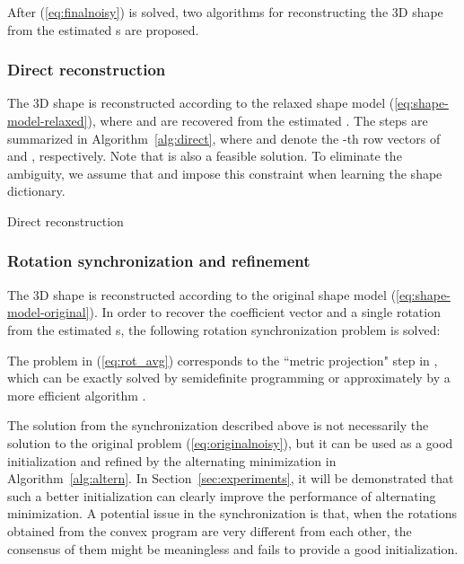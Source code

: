 \documentclass[10pt,journal,cspaper,compsoc]{IEEEtran}
\newcommand{\refEq}[1]{(\ref{#1})}
\newcommand{\refSec}[1]{Section~\ref{#1}}
\newcommand{\refAlg}[1]{Algorithm~\ref{#1}}
\begin{document}
After \refEq{eq:finalnoisy} is solved, two algorithms for reconstructing the 3D shape from the estimated s are proposed.

\subsubsection{Direct reconstruction}\label{sec:direct}

The 3D shape is reconstructed according to the relaxed shape model \refEq{eq:shape-model-relaxed}, where  and  are recovered from the estimated . The steps are summarized in \refAlg{alg:direct}, where  and  denote the -th row vectors of  and , respectively. Note that  is also a feasible solution. To eliminate the ambiguity, we assume that  and impose this constraint when learning the shape dictionary.

\begin{algorithm}\label{alg:direct}
\LinesNumbered
\caption{Direct reconstruction}
\KwIn{}
\KwOut{}
\vspace{0.5em}
\For{ \KwTo }{
\;
\;
\;
\;
\;
}
\;
\vspace{0.5em}
\end{algorithm}
\vspace{-1em}


\subsubsection{Rotation synchronization and refinement}\label{sec:refine}

The 3D shape is reconstructed according to the original shape model \refEq{eq:shape-model-original}. In order to recover the coefficient vector  and a single rotation  from the estimated s, the following rotation synchronization problem is solved:

The problem in \refEq{eq:rot_avg} corresponds to the ``metric projection" step in \cite{paladini2012optimal,del2012bilinear}, which can be exactly solved by semidefinite programming \cite{paladini2012optimal} or approximately by a more efficient algorithm \cite[Section 4.4.1]{del2012bilinear}.

The solution from the synchronization described above is not necessarily the solution to the original problem \refEq{eq:originalnoisy}, but it can be used as a good initialization and refined by the alternating minimization in \refAlg{alg:altern}. In \refSec{sec:experiments}, it will be demonstrated that such a better initialization can clearly improve the performance of alternating minimization.
A potential issue in the synchronization is that, when the rotations obtained from the convex program are very different from each other, the consensus of them might be meaningless and fails to provide a good initialization.
\end{document}
